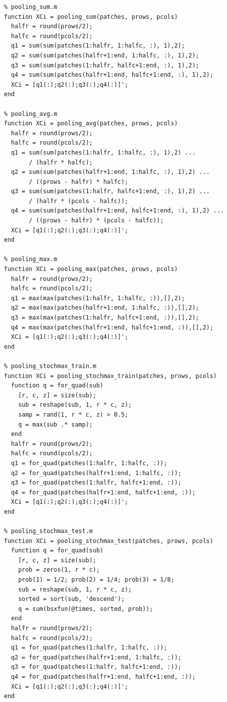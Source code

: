 \documentclass[a4paper,9pt]{article}
\begin{document}
\begin{lstlisting}
% pooling_sum.m
function XCi = pooling_sum(patches, prows, pcols)
  halfr = round(prows/2);
  halfc = round(pcols/2);
  q1 = sum(sum(patches(1:halfr, 1:halfc, :), 1),2);
  q2 = sum(sum(patches(halfr+1:end, 1:halfc, :), 1),2);
  q3 = sum(sum(patches(1:halfr, halfc+1:end, :), 1),2);
  q4 = sum(sum(patches(halfr+1:end, halfc+1:end, :), 1),2);
  XCi = [q1(:);q2(:);q3(:);q4(:)]';
end

% pooling_avg.m
function XCi = pooling_avg(patches, prows, pcols)
  halfr = round(prows/2);
  halfc = round(pcols/2);
  q1 = sum(sum(patches(1:halfr, 1:halfc, :), 1),2) ...
       / (halfr * halfc);
  q2 = sum(sum(patches(halfr+1:end, 1:halfc, :), 1),2) ...
       / ((prows - halfr) * halfc);
  q3 = sum(sum(patches(1:halfr, halfc+1:end, :), 1),2) ...
       / (halfr * (pcols - halfc));
  q4 = sum(sum(patches(halfr+1:end, halfc+1:end, :), 1),2) ...
       / ((prows - halfr) * (pcols - halfc));
  XCi = [q1(:);q2(:);q3(:);q4(:)]';
end

% pooling_max.m
function XCi = pooling_max(patches, prows, pcols)
  halfr = round(prows/2);
  halfc = round(pcols/2);
  q1 = max(max(patches(1:halfr, 1:halfc, :)),[],2);
  q2 = max(max(patches(halfr+1:end, 1:halfc, :)),[],2);
  q3 = max(max(patches(1:halfr, halfc+1:end, :)),[],2);
  q4 = max(max(patches(halfr+1:end, halfc+1:end, :)),[],2);
  XCi = [q1(:);q2(:);q3(:);q4(:)]';
end

% pooling_stochmax_train.m
function XCi = pooling_stochmax_train(patches, prows, pcols)
  function q = for_quad(sub)
    [r, c, z] = size(sub);
    sub = reshape(sub, 1, r * c, z);
    samp = rand(1, r * c, z) > 0.5;
    q = max(sub .* samp);
  end
  halfr = round(prows/2);
  halfc = round(pcols/2);
  q1 = for_quad(patches(1:halfr, 1:halfc, :));
  q2 = for_quad(patches(halfr+1:end, 1:halfc, :));
  q3 = for_quad(patches(1:halfr, halfc+1:end, :));
  q4 = for_quad(patches(halfr+1:end, halfc+1:end, :));
  XCi = [q1(:);q2(:);q3(:);q4(:)]';
end

% pooling_stochmax_test.m
function XCi = pooling_stochmax_test(patches, prows, pcols)
  function q = for_quad(sub)
    [r, c, z] = size(sub);
    prob = zeros(1, r * c);
    prob(1) = 1/2; prob(2) = 1/4; prob(3) = 1/8;
    sub = reshape(sub, 1, r * c, z);
    sorted = sort(sub, 'descend');
    q = sum(bsxfun(@times, sorted, prob));
  end
  halfr = round(prows/2);
  halfc = round(pcols/2);
  q1 = for_quad(patches(1:halfr, 1:halfc, :));
  q2 = for_quad(patches(halfr+1:end, 1:halfc, :));
  q3 = for_quad(patches(1:halfr, halfc+1:end, :));
  q4 = for_quad(patches(halfr+1:end, halfc+1:end, :));
  XCi = [q1(:);q2(:);q3(:);q4(:)]';
end


\end{lstlisting}
\end{document}
